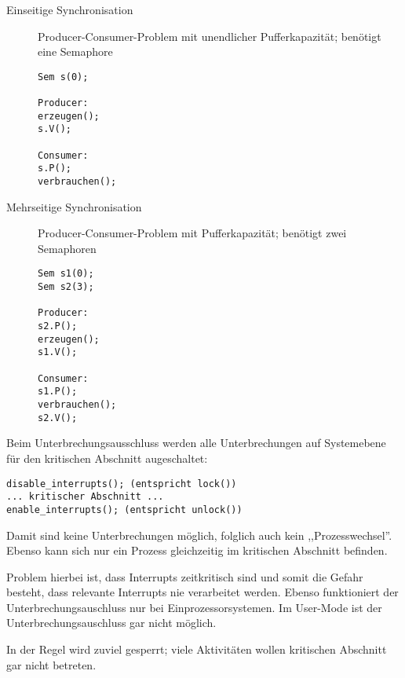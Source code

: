 \begin{answer}
\begin{description}

\item[Einseitige Synchronisation] Producer-Consumer-Problem mit unendlicher Pufferkapazität; benötigt eine Semaphore
\begin{verbatim}
Sem s(0);

Producer:
erzeugen();
s.V();

Consumer:
s.P();
verbrauchen();
\end{verbatim}

\item[Mehrseitige Synchronisation] Producer-Consumer-Problem mit Pufferkapazität; benötigt zwei Semaphoren
\label{mehrseitige-synchronisation-beispiel}

\begin{verbatim}
Sem s1(0);
Sem s2(3);

Producer:
s2.P();
erzeugen();
s1.V();

Consumer:
s1.P();
verbrauchen();
s2.V();
\end{verbatim}
\end{description}
\end{answer}

\begin{answer}
Beim Unterbrechungsausschluss werden alle Unterbrechungen auf Systemebene für den kritischen Abschnitt augeschaltet:

\begin{verbatim}
disable_interrupts(); (entspricht lock())
... kritischer Abschnitt ...
enable_interrupts(); (entspricht unlock())
\end{verbatim}

Damit sind keine Unterbrechungen möglich, folglich auch kein ,,Prozesswechsel''. Ebenso kann sich nur ein Prozess gleichzeitig im kritischen Abschnitt befinden.

Problem hierbei ist, dass Interrupts zeitkritisch sind und somit die Gefahr besteht, dass relevante Interrupts nie verarbeitet werden. Ebenso funktioniert der Unterbrechungsauschluss nur bei Einprozessorsystemen. Im User-Mode ist der Unterbrechungsauschluss gar nicht möglich.

In der Regel wird zuviel gesperrt; viele Aktivitäten wollen kritischen Abschnitt gar nicht betreten.
\end{answer}

